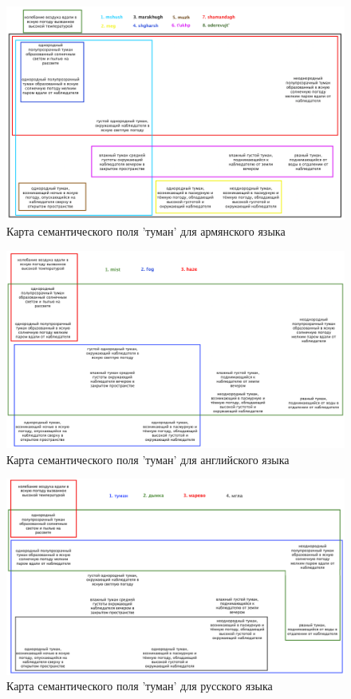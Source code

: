 \begin{figure}[H]
    \centering
    \includegraphics[width=\textwidth]{maps/ARMsemap.png}
    \caption{Карта семантического поля 'туман' для армянского языка}
    \label{fig:ARM}
\end{figure}

\bigskip

\begin{figure}[H]
    \centering
    \includegraphics[width=\textwidth]{maps/ENsemap.png}
    \caption{Карта семантического поля 'туман' для английского языка}
    \label{fig:EN}
\end{figure}

\begin{figure}[H]
    \centering
    \includegraphics[width=\textwidth]{maps/RUsemap.png}
    \caption{Карта семантического поля 'туман' для русского языка}
    \label{fig:RU}
\end{figure}


